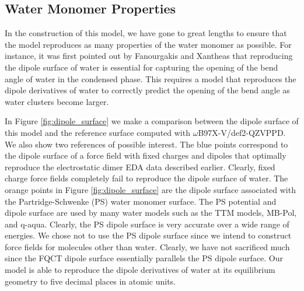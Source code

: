 \documentclass[journal=jctcce,manuscript=article]{achemso}
\begin{document}
\subsection*{Water Monomer Properties}
In the construction of this model, we have gone to great lengths to ensure that the model reproduces as many properties of the water monomer as possible. For instance, it was first pointed out by Fanourgakis and Xantheas that reproducing the dipole surface of water is essential for capturing the opening of the bend angle of water in the condensed phase.\cite{fanourgakis2006flexible} This requires a model that reproduces the dipole derivatives of water to correctly predict the opening of the bend angle as water clusters become larger. 

In Figure \ref{fig:dipole_surface} we make a comparison between the dipole surface of this model and the reference surface computed with $\omega$B97X-V/def2-QZVPPD. We also show two references of possible interest. The blue points correspond to the dipole surface of a force field with fixed charges and dipoles that optimally reproduce the electrostatic dimer EDA data described earlier. Clearly, fixed charge force fields completely fail to reproduce the dipole surface of water. The orange points in Figure \ref{fig:dipole_surface} are the dipole surface associated with the Partridge-Schwenke (PS) water monomer surface.\cite{partridge1997determination} The PS potential and dipole surface are used by many water models such as the TTM models,\cite{burnham1999parametrization,fanourgakis2006flexible} MB-Pol\cite{babin2013development,babin2014development}, and q-aqua\cite{yu2022q}. Clearly, the PS dipole surface is very accurate over a wide range of energies. We chose not to use the PS dipole surface since we intend to construct force fields for molecules other than water. Clearly, we have not sacrificed much since the FQCT dipole surface essentially parallels the PS dipole surface. Our model is able to reproduce the dipole derivatives of water at its equilibrium geometry to five decimal places in atomic units.
\end{document}
